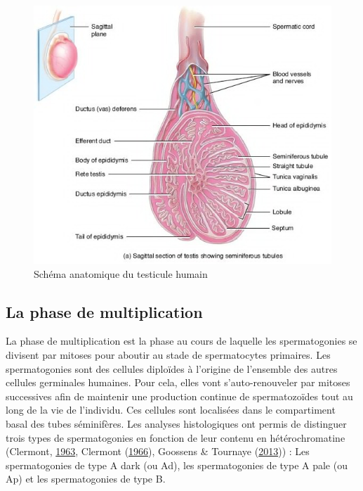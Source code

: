 \documentclass[12pt,twoside]{reedthesis}
\theoremstyle{definition}
\theoremstyle{definition}
\theoremstyle{remark}
\begin{document}
  \begin{figure}
  
  {\centering \includegraphics[scale=0.65]{figure/coupe_testicule2} 
  
  }
  
  \caption{Schéma anatomique du testicule humain}\label{fig:testicule}
  \end{figure}
  
  \newpage
  
  \subsection{La phase de
  multiplication}\label{la-phase-de-multiplication}
  
  La phase de multiplication est la phase au cours de laquelle les
  spermatogonies se divisent par mitoses pour aboutir au stade de
  spermatocytes primaires. Les spermatogonies sont des cellules diploïdes
  à l'origine de l'ensemble des autres cellules germinales humaines. Pour
  cela, elles vont s'auto-renouveler par mitoses successives afin de
  maintenir une production continue de spermatozoïdes tout au long de la
  vie de l'individu. Ces cellules sont localisées dans le compartiment
  basal des tubes séminifères. Les analyses histologiques ont permis de
  distinguer trois types de spermatogonies en fonction de leur contenu en
  hétérochromatine (Clermont, \protect\hyperlink{ref-Clermont1963}{1963},
  Clermont (\protect\hyperlink{ref-Clermont1966}{1966}), Goossens \&
  Tournaye (\protect\hyperlink{ref-Goossens2013}{2013})) : Les
  spermatogonies de type A dark (ou Ad), les spermatogonies de type A pale
  (ou Ap) et les spermatogonies de type B.
  
\end{document}
